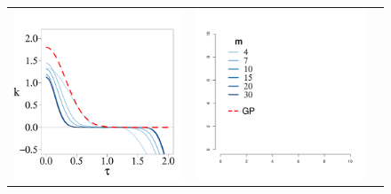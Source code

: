 \documentclass[onecolumn,a4paper,11pt]{article}
\begin{document}
\begin{figure}
\begin{tabular}{ c c c }
\includegraphics[scale=0.215, trim = 0mm 14mm 5mm 14mm, clip]{ch5_fig3_Cov_part1.pdf} & 
\multirow{32}{1cm}{ \includegraphics[scale=0.35, trim = 28mm 30mm 100mm 30mm, clip]{ch5_fig3_legend.pdf}}\\ 

\end{tabular}
\end{figure}
\end{document}
